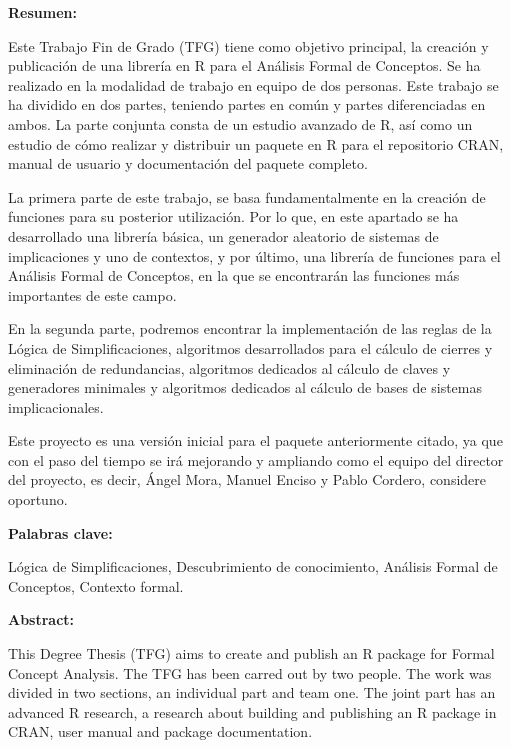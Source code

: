 \setcounter{page}{5}
{

\textbf{Resumen:}

Este Trabajo Fin de Grado (TFG) tiene como objetivo principal, la creaci\'on y publicaci\'on de una librer\'ia 
en R para el An\'alisis Formal de Conceptos. Se ha realizado en la modalidad de trabajo en equipo de dos personas. 
Este trabajo se ha dividido en dos partes, teniendo partes en com\'un y partes diferenciadas en ambos. La parte conjunta 
consta de un estudio avanzado de R, as\'i como un estudio de c\'omo realizar y distribuir un paquete en R para el repositorio 
CRAN, manual de usuario y documentaci\'on del paquete completo.

La primera parte de este trabajo, se basa fundamentalmente en la creaci\'on de funciones para su posterior utilizaci\'on. Por lo que, 
en este apartado se ha desarrollado una librer\'ia b\'asica, un generador aleatorio de sistemas de implicaciones y uno de contextos, y 
por \'ultimo, una librer\'ia de funciones para el An\'alisis Formal de Conceptos, en la que se encontrar\'an las funciones m\'as importantes 
de este campo.

En la segunda parte, podremos encontrar la implementaci\'on de las reglas de la L\'ogica de Simplificaciones, algoritmos desarrollados para 
el c\'alculo de cierres y eliminaci\'on de redundancias, algoritmos dedicados al c\'alculo de claves y generadores minimales y
algoritmos dedicados al c\'alculo de bases de sistemas implicacionales.

Este proyecto es una versi\'on inicial para el paquete anteriormente citado, ya que con el paso del tiempo se ir\'a mejorando y ampliando como 
el equipo del director del proyecto, es decir, \'Angel Mora, Manuel Enciso y Pablo Cordero, considere oportuno.



\bigskip

\textbf{Palabras clave:}

L\'ogica de Simplificaciones, Descubrimiento de conocimiento, 
An\'alisis Formal de Conceptos, Contexto formal.

\clearpage

\textbf{Abstract:}

This Degree Thesis (TFG) aims to create and publish an R package for Formal Concept Analysis. 
The TFG has been carred out by two people. The work was divided in two sections, an individual 
part and team one. The joint part has an advanced R research, a research about building and publishing 
an R package in CRAN, user manual and package documentation. 

}
